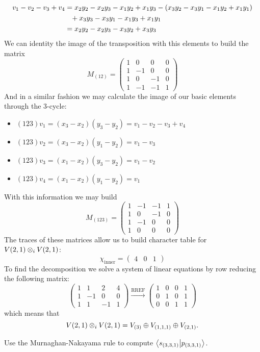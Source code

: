 \documentclass[12pt]{memoir}
\begin{document}
\begin{ptcbr}
\begin{align*}
    v_1-v_2-v_3+v_4&=x_2y_2-x_2y_3-x_1y_2+x_1y_3-(x_3y_2-x_3y_1-x_1y_2+x_1y_1)\\
    &\hphantom{=}+x_3y_3-x_3y_1-x_1y_3+x_1y_1\\
    &=x_2y_2-x_2y_3-x_3y_2+x_3y_3
    \end{align*} 
We can identity the image of the transposition with this elements to build the matrix 
$$M_{(12)}=\begin{pmatrix}
    1&0&0&0\\1&-1&0&0\\1&0&-1&0\\1&-1&-1&1
\end{pmatrix}$$
And in a similar fashion we may calculate the image of our basic elements through the $3$-cycle:
\begin{itemize}
    \item $(123)v_1=(x_3-x_2)(y_3-y_2)=v_1-v_2-v_3+v_4$
    \item $(123)v_2=(x_3-x_2)(y_1-y_2)=v_1-v_3$
    \item $(123)v_3=(x_1-x_2)(y_3-y_2)=v_1-v_2$
    \item $(123)v_4=(x_1-x_2)(y_1-y_2)=v_1$
\end{itemize}
With this information we may build
$$M_{(123)}=\begin{pmatrix}
    1&-1&-1&1\\1&0&-1&0\\1&-1&0&0\\1&0&0&0
\end{pmatrix}$$
The traces of these matrices allow us to build character table for $V(2,1)\otimes_i V(2,1)$:
    $$\chi_{\text{inner}}=\begin{pmatrix}
        4&0&1
    \end{pmatrix}$$
To find the decomposition we solve a system of linear equations by row reducing the following matrix:
$$\begin{pmatrix}
    1&1&2&4\\1&-1&0&0\\1&1&-1&1
\end{pmatrix}\xrightarrow[]{\text{RREF}}\begin{pmatrix}
    1&0&0&1\\0&1&0&1\\0&0&1&1
\end{pmatrix}$$
which means that
$$V(2,1)\otimes_i V(2,1)=V_{(3)}\oplus V_{(1,1,1)}\oplus V_{(2,1)}.$$
\end{ptcbr}

\begin{Ej}[Exercise 6]
    Use the Murnaghan-Nakayama rule to compute $\braket{s_{(3,3,1)}}{p_{(3,3,1)}}$.
\end{Ej}
\end{document}
